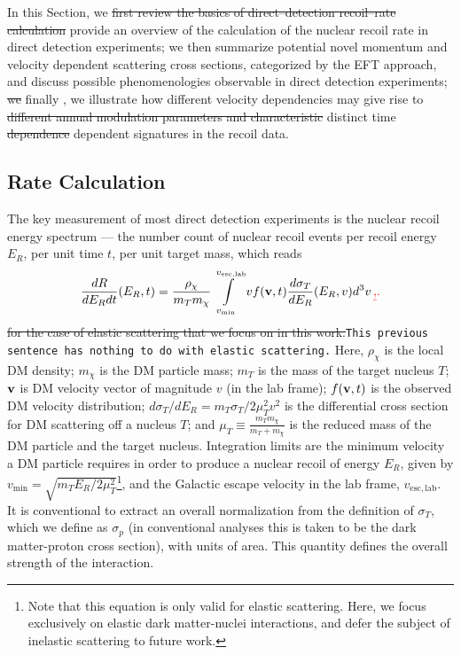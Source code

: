 \documentclass[11pt]{article}
\newcommand{\sjwColor}{red}
\newcommand{\sjw}[1]{{\color{\sjwColor} #1}}
\newcommand{\sjwrm}[1]{{\color{\sjwColor}\protect\sout{#1}}}
\newcommand{\sjwtt}[1]{{\color{\sjwColor}\tt #1}}
\begin{document}
In this Section, we \sjwrm{first review the basics of direct--detection recoil--rate calculation}\sjw{provide an overview of the calculation of the nuclear recoil rate in direct detection experiments}; we then summarize potential novel momentum and velocity dependent scattering cross sections, categorized by the EFT approach, and discuss possible phenomenologies observable in direct detection experiments; \sjwrm{we} finally\sjw{, we} illustrate how different velocity dependencies \sjw{may} give rise to \sjwrm{different annual modulation parameters and characteristic}\sjw{distinct} time \sjwrm{dependence} \sjw{dependent} signatures in \sjw{the} recoil data.

\subsection{Rate Calculation}\label{sec:rate}

The key measurement of most direct detection experiments is the nuclear recoil energy spectrum --- the number count of nuclear recoil events per recoil energy $E_R$, per unit time $t$, per unit target mass, which reads
\begin{equation}
\frac{dR}{dE_R dt}(E_R,t) =  \frac{\rho_\chi}{m_T m_\chi} \int\limits_{v_{\mathrm{min}}}^{v_{\mathrm{esc, lab}}}  v f(\mathrm{\mbox{\bf{v}}},t) \frac{d\sigma_T}{dE_R} (E_R,v) d^3v \, \sjwrm{,}\sjw{.}
\label{eq:dRdEr_general}
\end{equation}
\sjwrm{for the case of elastic scattering that we focus on in this work.}\sjwtt{This previous sentence has nothing to do with elastic scattering.} Here, $\rho_\chi$ is the local DM density; $m_\chi$ is the DM particle mass; $m_T$ is the mass of the target nucleus $T$; $\mathrm{\mbox{\bf{v}}}$ is DM velocity vector of magnitude $v$ (in the lab frame); $f(\mathrm{\mbox{\bf{v}}}, t)$ is the observed DM velocity distribution; $d\sigma_T/dE_R=m_T \sigma_T /2\mu_T^2 v^2$ is the differential cross section for DM scattering off a nucleus $T$; and $\mu_T\equiv\frac{m_Tm_\chi}{m_T+m_\chi}$ is the reduced mass of the DM particle and the target nucleus. Integration limits are the minimum velocity a DM particle requires in order to produce a nuclear recoil of energy $E_R$, given by $v_\mathrm{min} = \sqrt{m_T E_R/2\mu_T^2}$\footnote{\sjw{Note that this equation is only valid for elastic scattering. Here, we focus exclusively on elastic dark matter-nuclei interactions, and defer the subject of inelastic scattering to future work.}}, and the Galactic escape velocity in the lab frame, $v_{\mathrm{esc, lab}}$. \sjw{It is conventional to extract an overall normalization from the definition of $\sigma_T$, which we define as $\sigma_p$ (in conventional analyses this is taken to be the dark matter-proton cross section), with units of area. This quantity defines the overall strength of the interaction. }
\end{document}

